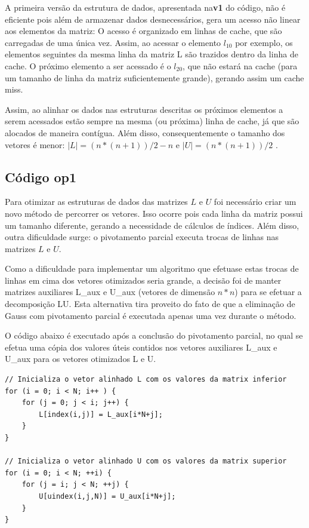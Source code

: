 \documentclass[12pt]{article}
\begin{document}
A primeira versão da estrutura de dados, apresentada na\textbf{v1} do código, não é eficiente pois além de armazenar dados desnecessários, gera um acesso não linear aos elementos da matriz: O acesso é organizado em linhas de cache, que são carregadas de uma única vez. Assim, ao acessar o elemento $l_{10}$ por exemplo, os elementos seguintes da mesma linha da matriz L são trazidos dentro da linha de cache. O próximo elemento a ser acessado é o $l_{20}$, que não estará na cache (para um tamanho de linha da matriz suficientemente grande), gerando assim um cache miss.

Assim, ao alinhar os dados nas estruturas descritas os próximos elementos a serem acessados estão sempre na mesma (ou próxima) linha de cache, já que são alocados de maneira contígua. Além disso, consequentemente o tamanho dos vetores é menor: $|L| = (n * (n+1)) / 2 - n$ e $|U| = (n * (n+1)) / 2$ .


\subsection{Código op1}

Para otimizar as estruturas de dados das matrizes $L$ e $U$ foi necessário criar um novo método de percorrer os vetores. Isso ocorre pois cada linha da matriz possui um tamanho diferente, gerando a necessidade de cálculos de índices. Além disso, outra dificuldade surge: o pivotamento parcial executa trocas de linhas nas matrizes $L$ e $U$.

Como a dificuldade para implementar um algoritmo que efetuase estas trocas de linhas em cima dos vetores otimizados seria grande, a decisão foi de manter matrizes auxiliares L\_aux e U\_aux (vetores de dimensão $n * n$) para se efetuar a decomposição LU. Esta alternativa tira proveito do fato de que a eliminação de Gauss com pivotamento parcial é executada apenas uma vez durante o método.

O código abaixo é executado após a conclusão do pivotamento parcial, no qual se efetua uma cópia dos valores úteis contidos nos vetores auxiliares L\_aux e U\_aux para os vetores otimizados L e U.

\begin{lstlisting}
// Inicializa o vetor alinhado L com os valores da matrix inferior
for (i = 0; i < N; i++ ) {
    for (j = 0; j < i; j++) {
        L[index(i,j)] = L_aux[i*N+j];
    }
}

// Inicializa o vetor alinhado U com os valores da matrix superior
for (i = 0; i < N; ++i) {
    for (j = i; j < N; ++j) {
        U[uindex(i,j,N)] = U_aux[i*N+j];
    }
}
\end{lstlisting}
\end{document}
